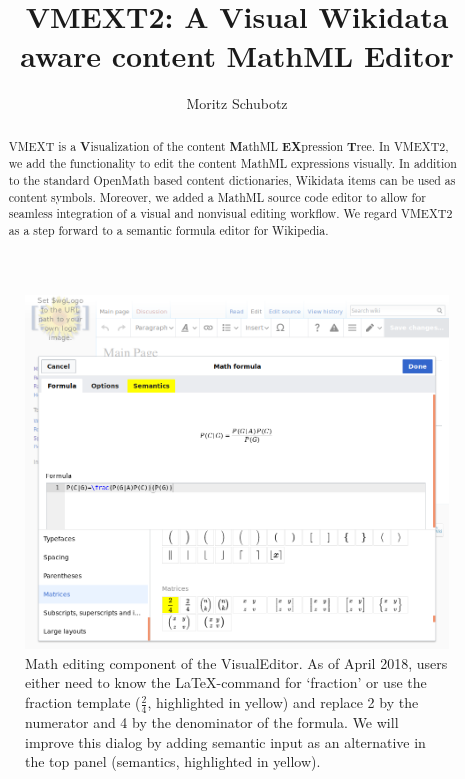 \documentclass{llncs}
\begin{document}
\title{VMEXT2: A Visual Wikidata aware content MathML Editor}
\author{Moritz Schubotz}
\maketitle

\begin{abstract}
VMEXT is a {\bf V}isualization of the content {\bf M}athML {\bf EX}pression {\bf T}ree.
In VMEXT2, we add the functionality to edit the content MathML expressions visually.
In addition to the standard OpenMath based content dictionaries, Wikidata items can be used as content symbols.
Moreover, we added a MathML source code editor to allow for seamless integration of a visual and nonvisual editing workflow.
We regard VMEXT2 as a step forward to a semantic formula editor for Wikipedia.
\end{abstract}

\begin{figure}[t]
\includegraphics[width=\textwidth]{images/overview.png}
\caption{Math editing component of the VisualEditor.
 As of April 2018, users either need to know the LaTeX-command for `fraction' or use the fraction template ($\frac{2}{4}$, highlighted in yellow) and replace 2 by the numerator and 4 by the denominator of the formula.
 We will improve this dialog by adding semantic input as an alternative in the top panel (semantics, highlighted in yellow).}\label{fig.overview}
\end{figure}
\end{document}
